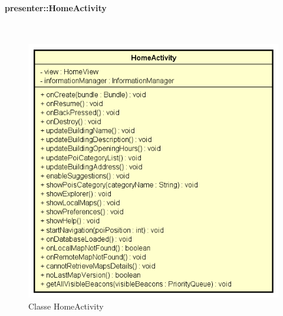 \documentclass[../DefinizioneDiProdotto.tex]{subfiles}
\begin{document}
\paragraph{presenter::HomeActivity}
\
\begin{figure}[H]
	\centering
	\includegraphics[width=\maxwidth]{img/HomeActivity.png}
	\caption{Classe HomeActivity}\label{fig:presenter::HomeActivity} 
\end{figure}
\end{document}
